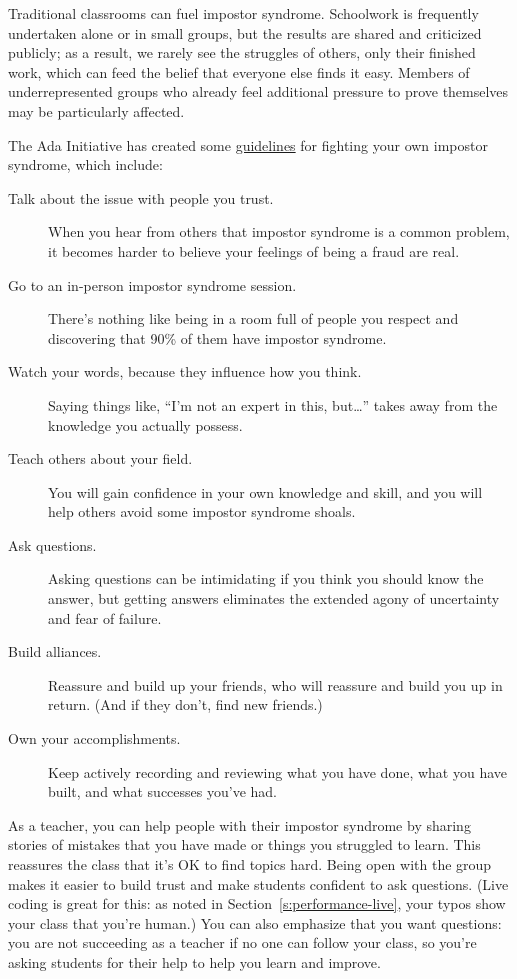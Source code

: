 Traditional classrooms can fuel impostor syndrome. Schoolwork is
frequently undertaken alone or in small groups, but the results are
shared and criticized publicly; as a result, we rarely see the struggles
of others, only their finished work, which can feed the belief that
everyone else finds it easy. Members of underrepresented groups who
already feel additional pressure to prove themselves may be particularly
affected.

The Ada Initiative has created some \href{https://www.usenix.org/blog/impostor-syndrome-proof-yourself-and-your-community}{guidelines} for
fighting your own impostor syndrome, which include:

\begin{description}
\item[Talk about the issue with people you trust.]
When you hear from others that impostor syndrome is a common
problem, it becomes harder to believe your feelings of being a fraud
are real.
\item[Go to an in-person impostor syndrome session.]
There's nothing like being in a room full of people you respect and
discovering that 90\% of them have impostor syndrome.
\item[Watch your words, because they influence how you think.]
Saying things like, ``I'm not an expert in this, but{\ldots}''
takes away from the knowledge you actually possess.
\item[Teach others about your field.]
You will gain confidence in your own knowledge and skill, and you
will help others avoid some impostor syndrome shoals.
\item[Ask questions.]
Asking questions can be intimidating if you think you should know
the answer, but getting answers eliminates the extended agony of
uncertainty and fear of failure.
\item[Build alliances.]
Reassure and build up your friends, who will reassure and build you
up in return. (And if they don't, find new friends.)
\item[Own your accomplishments.]
Keep actively recording and reviewing what you have done, what you
have built, and what successes you've had.
\end{description}

As a teacher, you can help people with their impostor syndrome by
sharing stories of mistakes that you have made or things you struggled
to learn. This reassures the class that it's OK to find topics hard.
Being open with the group makes it easier to build trust and make
students confident to ask questions. (Live coding is great for this: as
noted in Section~\ref{s:performance-live}, your typos show your class
that you're human.) You can also emphasize that you want questions: you
are not succeeding as a teacher if no one can follow your class, so
you're asking students for their help to help you learn and improve.

